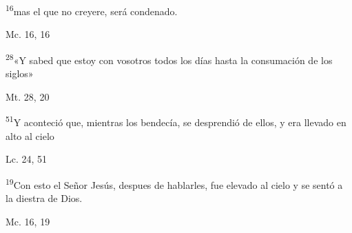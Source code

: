 \documentclass[a4paper,11pt]{article}
\begin{document}
      \textsuperscript{16}mas el que no creyere, será condenado.
      \begin{flushright}
        Mc. 16, 16
      \end{flushright}      
      \textsuperscript{28}«Y sabed que estoy con vosotros todos los días hasta la consumación de los siglos»
      \begin{flushright}
        Mt. 28, 20
      \end{flushright}      
      \textsuperscript{51}Y aconteció que, mientras los bendecía, se desprendió de ellos, y era llevado en alto al cielo
      \begin{flushright}
        Lc. 24, 51
      \end{flushright}      
      \textsuperscript{19}Con esto el Señor Jesús, despues de hablarles, fue elevado al cielo y se sentó a la diestra de Dios.
      \begin{flushright}
        Mc. 16, 19
      \end{flushright}
\end{document}

